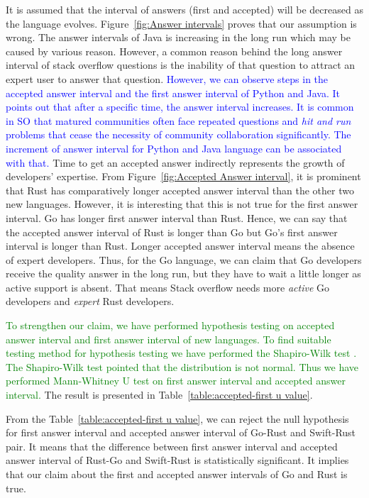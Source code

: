 It is assumed that the interval of answers (first and accepted) will be decreased as the language evolves. Figure~\ref{fig:Answer intervals} proves that our assumption is wrong. The answer intervals of Java is increasing in the long run which may be caused by various reason. However, a common reason behind the long answer interval of  stack overflow questions is the inability of that question to attract an expert user to answer that question\citep{Asaduzzaman2013}. \textcolor{blue}{ However, we can observe steps in the accepted answer interval and the first answer interval of Python and Java. It points out that after a specific time, the answer interval increases. It is common in SO that matured communities often face repeated questions and \emph{hit and run}\citep{DBLP:journals/corr/ChengDL14,SO:decay} problems that cease the necessity of  community collaboration significantly. The increment of answer interval for Python and Java language can be associated with that.}
Time to get an accepted answer indirectly represents the growth of developers' expertise. From Figure~\ref{fig:Accepted Answer interval}, it is prominent that Rust has comparatively longer accepted answer interval than the other two new languages. However, it is interesting that this is not true for the first answer interval. Go has longer first answer interval than Rust. Hence, we can say that the accepted answer interval of Rust is longer than Go but Go's first answer interval is longer than Rust. Longer accepted answer interval means the absence of expert developers. Thus, for the Go language, we can claim that Go developers receive the quality answer in the long run, but they have to wait a little longer as active support is absent. That means Stack overflow needs more \emph{active} Go developers and \emph{expert} Rust developers.


\textcolor{green}{To strengthen our claim, we have performed hypothesis testing on accepted answer interval and first answer interval of new languages. To find suitable testing method for hypothesis testing we have performed the Shapiro-Wilk test \citep{SHAPIRO1965}. The Shapiro-Wilk test pointed that the distribution is not normal. Thus we have performed Mann-Whitney U test on first answer interval and accepted answer interval.} The result is presented in Table~\ref{table:accepted-first u value}.

From the Table~\ref{table:accepted-first u value}, we can reject the null hypothesis for first answer interval and accepted answer interval of Go-Rust and Swift-Rust pair. It means that the difference between first answer interval and accepted answer interval of Rust-Go and Swift-Rust is statistically significant. It implies that our claim about the first and accepted answer intervals of Go and Rust is true.


